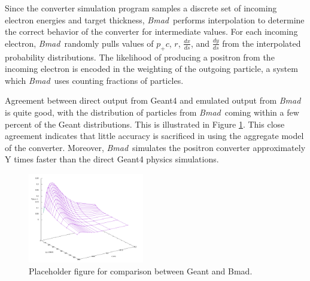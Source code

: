 \documentclass[letter,
               biblatex,     %
               keeplastbox,   %
               ]{jacow}
\newcommand{\bmad}{\textit{Bmad}\xspace}
\newcommand{\dxds}{\frac{dx}{ds}}
\newcommand{\dyds}{\frac{dy}{ds}}
\begin{document}
Since the converter simulation program samples a discrete set of incoming electron energies and target thickness, \bmad \, performs interpolation to determine the correct behavior of the converter for intermediate values.
For each incoming electron, \bmad \, randomly pulls values of $p_+ c$, $r$, $\dxds$, and $\dyds$ from the interpolated probability distributions.
The likelihood of producing a positron from the incoming electron is encoded in the weighting of the outgoing particle, a system which \bmad \, uses counting fractions of particles.

Agreement between direct output from Geant4 and emulated output from \bmad \, is quite good, with the distribution of particles from \bmad \, coming within a few percent of the Geant distributions.
This is illustrated in Figure \ref{fig:bmad}. %
This close agreement indicates that little accuracy is sacrificed in using the aggregate model of the converter.
Moreover, \bmad \, simulates the positron converter approximately Y times faster than the direct Geant4 physics simulations. %

\begin{figure}
\centering
\includegraphics[width=0.45\textwidth]{p1}
\caption{Placeholder figure for comparison between Geant and Bmad.}
\label{fig:bmad}
\end{figure}

%
%
%


%
%
%
%
%
%
\end{document}
